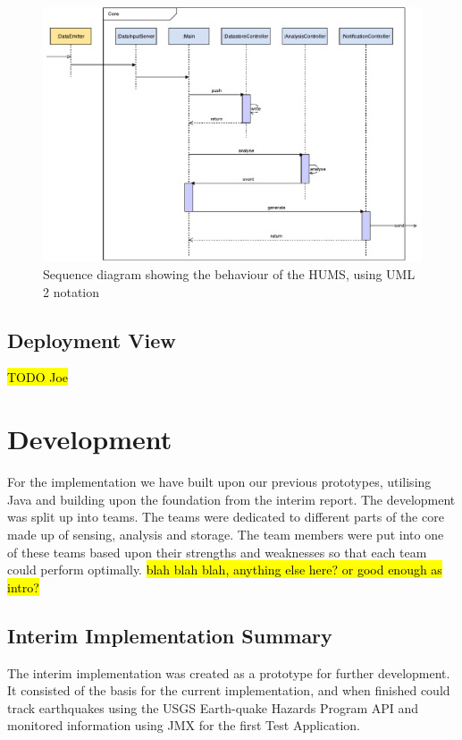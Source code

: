 \documentclass[10pt,a4paper]{article}
\begin{document}
\begin{figure}[tbp]
  \centering
  \includegraphics[width=\textwidth]{images/behaviourView.pdf}
  \caption{Sequence diagram showing the behaviour of the HUMS, using UML 2 notation}
  \label{fig:sequence}
\end{figure}


\subsection{Deployment View}
\hl{TODO Joe}
\section{Development}
\label{sec:dev}
For the implementation we have built upon our previous prototypes, utilising Java and building upon the foundation from the interim report. The development was split up into teams. The teams were dedicated to different parts of the core made up of sensing, analysis and storage. The team members were put into one of these teams based upon their strengths and weaknesses so that each team could perform optimally. \hl{blah blah blah, anything else here? or good enough as intro?}

\subsection{Interim Implementation Summary}
\label{sec:interim_summary}
The interim implementation was created as a prototype for further development. It consisted of the basis for the current implementation, and when finished could track earthquakes using the USGS Earth-quake Hazards Program API and monitored information using JMX for the first Test Application.
\end{document}
